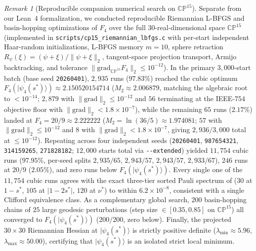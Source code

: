 \documentclass[11pt,a4paper]{article}
\theoremstyle{plain}
\theoremstyle{definition}
\theoremstyle{remark}
\newtheorem{remark}[lemma]{Remark}
\newcommand{\CP}{\mathbb{CP}}
\newcommand{\ket}[1]{|#1\rangle}
\newcommand{\abs}[1]{\lvert#1\rvert}
\newcommand{\norm}[1]{\lVert#1\rVert}
\numberwithin{equation}{section}
\begin{document}
\begin{remark}[Reproducible companion numerical search on $\CP^{15}$]\label{rem:cp15-numerics}
Separate from our Lean~4 formalization, we conducted reproducible Riemannian L-BFGS and basin-hopping optimizations of $F_4$ over the full $30$-real-dimensional space $\CP^{15}$ (implemented in \texttt{\small scripts/\allowbreak cp15\_\allowbreak riemannian\_\allowbreak lbfgs.c} with per-start independent Haar-random initializations, L-BFGS memory $m = 10$, sphere retraction $R_\psi(\xi) = (\psi + \xi)/\norm{\psi + \xi}_2$, tangent-space projection transport, Armijo backtracking, and tolerance $\norm{\mathrm{grad}_{\CP^{15}} F_4}_2 \le 10^{-12}$). In the primary $3{,}000$-start batch (base seed \texttt{20260401}), $2{,}935$ runs ($97.83\%$) reached the cubic optimum $F_4(\ket{\psi_4(s^*)}) \approx 2.150520154714$ ($M_2 \approx 2.006879$, matching the algebraic root to $< 10^{-14}$; $2{,}879$ with $\norm{\mathrm{grad}}_2 \le 10^{-12}$ and $56$ terminating at the IEEE-$754$ objective floor with $\norm{\mathrm{grad}}_2 < 1.8\times 10^{-7}$), while the remaining $65$ runs ($2.17\%$) landed at $F_4 = 20/9 \approx 2.222222$ ($M_2 = \ln(36/5) \approx 1.974081$; $57$ with $\norm{\mathrm{grad}}_2 \le 10^{-12}$ and $8$ with $\norm{\mathrm{grad}}_2 < 1.8\times 10^{-7}$, giving $2{,}936/3{,}000$ total at $\le 10^{-12}$). Repeating across four independent seeds (\texttt{20260401}, \texttt{987654321}, \texttt{314159265}, \texttt{271828182}; $12{,}000$ starts total via \texttt{-{}-extended}) yielded $11{,}754$ cubic runs ($97.95\%$, per-seed splits $2{,}935/65$, $2{,}943/57$, $2{,}943/57$, $2{,}933/67$), $246$ runs at $20/9$ ($2.05\%$), and zero runs below $F_4(\ket{\psi_4(s^*)})$. Every single one of the $11{,}754$ cubic runs agrees with the exact three-tier sorted Pauli spectrum of  ($30$ at $1-s^*$, $105$ at $\abs{1-2s^*}$, $120$ at $\nu^*$) to within $6.2 \times 10^{-8}$, consistent with a single Clifford equivalence class. As a complementary global search, $200$ basin-hopping chains of $25$ large geodesic perturbations (step size $\in [0.35, 0.85]$ on $\CP^{15}$) all converged to $F_4(\ket{\psi_4(s^*)})$ ($200/200$, zero below). Finally, the projected $30 \times 30$ Riemannian Hessian at $\ket{\psi_4(s^*)}$ is strictly positive definite ($\lambda_{\min} \approx 5.96$, $\lambda_{\max} \approx 50.00$), certifying that $\ket{\psi_4(s^*)}$ is an isolated strict local minimum.
\end{remark}
\end{document}
